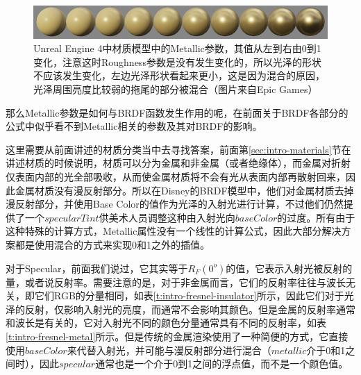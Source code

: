 \begin{figure}
\begin{fullwidth}
	\includegraphics[width=1.\thewidth]{graphics/gi/metallic}
\caption{Unreal Engine 4中材质模型中的Metallic参数，其值从左到右由0到1变化，注意这时Roughness参数是没有发生变化的，所以光泽的形状不应该发生变化，左边光泽形状看起来更小，这是因为混合的原因，光泽周围亮度比较弱的拖尾的部分被混合（图片来自Epic Games）}
\label{f:intro-ue4-material-metallic}
\end{fullwidth}
\end{figure}

那么Metallic参数是如何与BRDF函数发生作用的呢，在前面关于BRDF各部分的公式中似乎看不到Metallic相关的参数及其对BRDF的影响。

这里需要从前面讲述的材质分类当中去寻找答案，前面第\ref{sec:intro-materials}节在讲述材质的时候说明，材质可以分为金属和非金属（或者绝缘体），而金属对折射仅表面内部的光全部吸收，从而使金属材质将不会有光从表面内部再散射回来，因此金属材质没有漫反射部分。所以在Disney的BRDF模型中，他们对金属材质去掉漫反射部分，并使用Base Color的值作为光泽的入射光进行计算，不过他们仍然提供了一个$specularTint$供美术人员调整这种由入射光向$baseColor$的过度。所有由于这种特殊的计算方式，Metallic属性没有一个线性的计算公式，因此大部分解决方案都是使用混合的方式来实现0和1之外的插值。

对于Specular，前面我们说过，它其实等于$R_F(0^o)$的值，它表示入射光被反射的量，或者说反射率。需要注意的是，对于非金属而言，它们的反射率往往与波长无关，即它们RGB的分量相同，如表\ref{t:intro-fresnel-insulator}所示，因此它们对于光泽的反射，仅影响入射光的亮度，而通常不会影响其颜色。但是金属的反射率通常和波长是有关的，它对入射光不同的颜色分量通常具有不同的反射率，如表\ref{t:intro-fresnel-metal}所示。但是传统的金属渲染使用了一种简便的方式，它直接使用$baseColor$来代替入射光，并可能与漫反射部分进行混合（$metallic$介于0和1之间时），因此$specular$通常也是一个介于0到1之间的浮点值，而不是一个颜色值。




